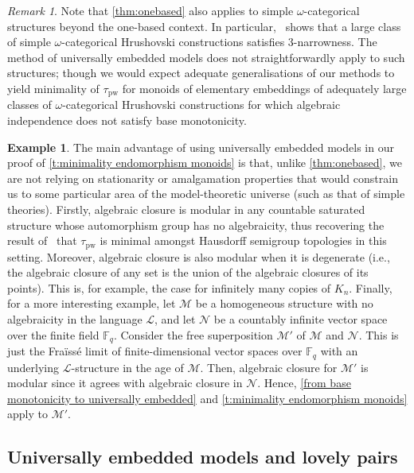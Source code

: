 \documentclass{article}
\theoremstyle{remark}
\newtheorem{remark}[theorem]{Remark}
\theoremstyle{definition}
\newtheorem{example}[theorem]{Example}
\newcommand{\M}[0]{\mathcal{M}}
\newcommand{\pw}[0]{\tau_{\mathrm{pw}}}
\begin{document}
{{{{{\begin{remark}Note that \cref{thm:onebased} also applies to simple $\omega$-categorical structures beyond the one-based context. In particular,~\cite[Section 3E]{ghaddln24} shows that a large class of simple $\omega$-categorical Hrushovski constructions satisfies $3$-narrowness. The method of universally embedded models does not straightforwardly apply to such structures; though we would expect adequate generalisations of our methods to yield minimality of $\pw$ for monoids of elementary embeddings of adequately large classes of $\omega$-categorical Hrushovski constructions for which algebraic independence does not satisfy base monotonicity. 
\end{remark}





 \begin{example} {The main advantage of using universally} embedded models 
 in our proof of \cref{t:minimality endomorphism monoids} is that, unlike \cref{thm:onebased}, we are not relying on stationarity or amalgamation properties that would constrain us to some particular area of the model-theoretic universe (such as that of simple theories). Firstly, algebraic closure is modular in any countable saturated structure whose automorphism group has no algebraicity, thus recovering the result of~\cite{pinskerschindler} that $\pw$ is minimal amongst Hausdorff semigroup topologies in this setting. Moreover, algebraic closure is also modular when it is degenerate (i.e., the algebraic closure of any set is the union of the algebraic closures of its points). This is, for example, the case for infinitely many copies of $K_n$. Finally, for a more interesting example, let $\M$ be a homogeneous structure with no algebraicity in the language $\mathcal{L}$, and let $\mathcal{N}$ be a countably infinite vector space over the finite field $\mathbb{F}_q$.
 Consider the free superposition $\M'$ of $\M$ and $\mathcal{N}$. This is just the Fra\"{i}ss\'{e} limit of finite-dimensional vector spaces over $\mathbb{F}_q$ with an underlying $\mathcal{L}$-structure in the age of $\M$.
{Then, algebraic closure for $\M'$ is modular since it agrees with algebraic closure in $\mathcal{N}$. Hence, 
\cref{from base monotonicity to universally embedded} and \cref{t:minimality endomorphism monoids} apply to $\M'$.}
 \end{example}


\subsection{Universally embedded models and lovely pairs}\label{sub:universalfromlovely}

}}}}}
\end{document}
